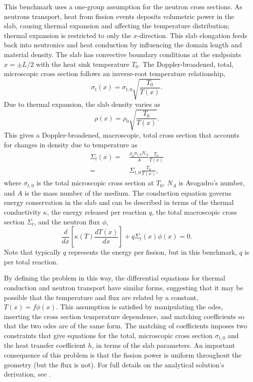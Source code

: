 \documentclass[letterpaper]{mc2023}
\begin{document}
This benchmark uses a one-group assumption for the neutron cross sections. As neutrons transport, heat from fission events deposits
volumetric power in the slab, causing thermal expansion and affecting the temperature distribution; thermal expansion is restricted
to only the $x$-direction. This slab elongation feeds back into neutronics and heat conduction by influencing the domain length and
material density. The slab has convective boundary conditions at the endpoints $x=\pm L/2$ with the heat sink temperature
$T_{0}$. The Doppler-broadened, total, microscopic cross section follows an inverse-root temperature relationship,
\begin{equation}
    \sigma_{t}(x) = \sigma_{t,0}\sqrt{\frac{T_{0}}{T(x)}}.
\end{equation}
Due to thermal expansion, the slab density varies as
\begin{equation} \label{sec:intro:density}
    \rho(x) =  \rho_{0} \sqrt{\frac{T_{0}}{T(x)}}.
\end{equation}
This gives a Doppler-broadened, macroscopic, total cross section that accounts for changes in density due to temperature as
\begin{equation}\begin{aligned} \label{sec:intro:doppler}
    \Sigma_{t}(x) =&\  \frac{\rho_{0}\sigma_{t,0} N_{A}}{A} \frac{T_{0}}{T(x)}\\
    =&\  \Sigma_{t,0}\frac{T_{0}}{T(x)} ,
\end{aligned}\end{equation}
where $ \sigma_{t,0}$ is the total microscopic cross section at $T_{0}$, $N_{A}$ is Avogadro's number, and $A$ is the mass number
of the medium. The conduction equation governs energy conservation in the slab and can be described in terms of the thermal conductivity
$\kappa$, the energy released per reaction $q$, the total macroscopic cross section $\Sigma_{t}$, and the neutron flux $\phi$,
\begin{equation}
     \frac{d}{dx}\left\lbrack\kappa(T)\frac{dT(x)}{dx}\right\rbrack + q \Sigma_{t}(x)\phi(x) = 0.
\end{equation}
Note that typically $q$ represents the energy per fission, but in this benchmark, $q$ is per total reaction.

By defining the problem in this way, the differential equations for thermal conduction and neutron transport have similar forms,
suggesting that it may be possible that the temperature and flux are related by a constant, $T(x)=f\phi(x)$. This
assumption is satisfied by manipulating the \glspl{ode}, inserting the cross section temperature dependence, and matching
coefficients so that the two \glspl{ode} are of the same form. The matching of coefficients imposes two constraints that give
equations for the total, microscopic cross section $\sigma_{t,0}$ and the heat transfer coefficient $h$, in terms of the slab
parameters. An important consequence of this problem is that the fission power is uniform throughout the geometry (but the
flux is not). For full details on the analytical solution's derivation, see \cite{analytical-benchmark}.
\end{document}
